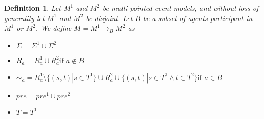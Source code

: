 \documentclass[12pt, a4paper, titlepage]{scrartcl}
\newtheorem{defn}{Definition}
\begin{document}
\begin{defn} \label{possTwo}
Let $M^1$ and $M^2$ be multi-pointed event models, and without loss of
generality let $M^1$ and $M^2$ be disjoint.
Let $B$ be a subset of agents participant in $M^1$ or $M^2$.
We define $M = M^1 \mapsto_B M^2$ as 
\begin{itemize}
  \item $\Sigma = \Sigma^1 \cup \Sigma^2$
  \item $R_a =
    R^1_a \cup R^2_a \text{if } a \notin B$
	\item $\sim_a =
      R^1_a \setminus \{(s,t) | s \in T^1 \} \cup
      R^2_a \cup
      \{(s,t) | s \in T^1 \land t \in T^2 \}
    \text{if } a \in B$
  \item $pre = pre^1 \cup pre^2$
  \item $T = T^1$
\end{itemize}
\end{defn}
\end{document}
